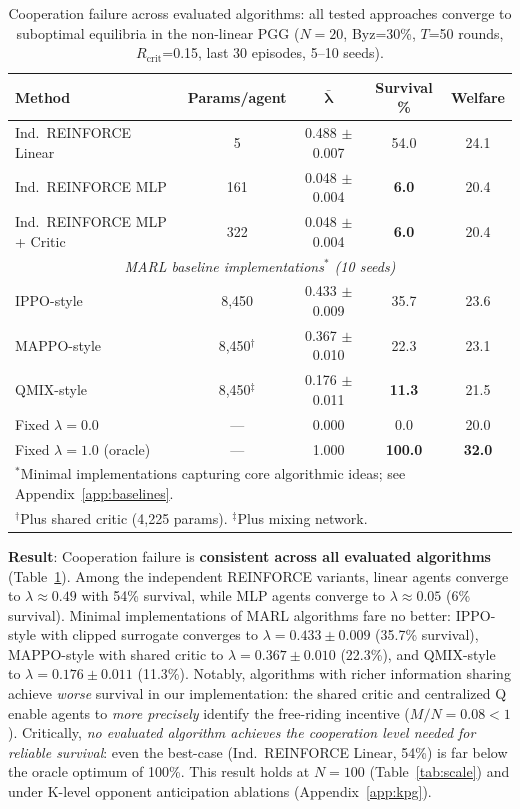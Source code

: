 \documentclass{article}
\begin{document}
\begin{table}[t]
\centering
\caption{Cooperation failure across evaluated algorithms: all tested approaches converge to suboptimal equilibria in the non-linear PGG ($N{=}20$, Byz=30\%, $T$=50 rounds, $R_{\text{crit}}$=0.15, last 30 episodes, 5--10 seeds).}
\label{tab:emergence}
\begin{tabular}{lcccc}
\toprule
\textbf{Method} & \textbf{Params/agent} & $\boldsymbol{\bar{\lambda}}$ & \textbf{Survival \%} & \textbf{Welfare} \\
\midrule
Ind.\ REINFORCE Linear & 5 & 0.488 $\pm$ 0.007 & 54.0 & 24.1 \\
Ind.\ REINFORCE MLP & 161 & 0.048 $\pm$ 0.004 & \textbf{6.0} & 20.4 \\
Ind.\ REINFORCE MLP + Critic & 322 & 0.048 $\pm$ 0.004 & \textbf{6.0} & 20.4 \\
\midrule
\multicolumn{5}{c}{\textit{MARL baseline implementations$^*$ (10 seeds)}} \\
\midrule
IPPO-style~\citep{schulman2017proximal} & 8,450 & 0.433 $\pm$ 0.009 & 35.7 & 23.6 \\
MAPPO-style~\citep{yu2022surprising} & 8,450$^\dagger$ & 0.367 $\pm$ 0.010 & 22.3 & 23.1 \\
QMIX-style~\citep{rashid2018qmix} & 8,450$^\ddagger$ & 0.176 $\pm$ 0.011 & \textbf{11.3} & 21.5 \\
\midrule
Fixed $\lambda=0.0$ & --- & 0.000 & 0.0 & 20.0 \\
Fixed $\lambda=1.0$ (oracle) & --- & 1.000 & \textbf{100.0} & \textbf{32.0} \\
\bottomrule
\multicolumn{5}{l}{\small $^*$Minimal implementations capturing core algorithmic ideas; see Appendix~\ref{app:baselines}.} \\
\multicolumn{5}{l}{\small $^\dagger$Plus shared critic (4,225 params). $^\ddagger$Plus mixing network.} \\
\end{tabular}
\end{table}

\textbf{Result}: Cooperation failure is \textbf{consistent across all evaluated algorithms} (Table~\ref{tab:emergence}).
Among the independent REINFORCE variants, linear agents converge to $\lambda \approx 0.49$ with 54\% survival, while MLP agents converge to $\lambda \approx 0.05$ (6\% survival).
Minimal implementations of MARL algorithms fare no better: IPPO-style with clipped surrogate converges to $\lambda = 0.433 \pm 0.009$ (35.7\% survival), MAPPO-style with shared critic to $\lambda = 0.367 \pm 0.010$ (22.3\%), and QMIX-style to $\lambda = 0.176 \pm 0.011$ (11.3\%).
Notably, algorithms with richer information sharing achieve \emph{worse} survival in our implementation: the shared critic and centralized Q enable agents to \emph{more precisely} identify the free-riding incentive ($M/N = 0.08 < 1$).
Critically, \emph{no evaluated algorithm achieves the cooperation level needed for reliable survival}: even the best-case (Ind.\ REINFORCE Linear, 54\%) is far below the oracle optimum of 100\%.
This result holds at $N=100$ (Table~\ref{tab:scale}) and under K-level opponent anticipation ablations (Appendix~\ref{app:kpg}).
\end{document}
